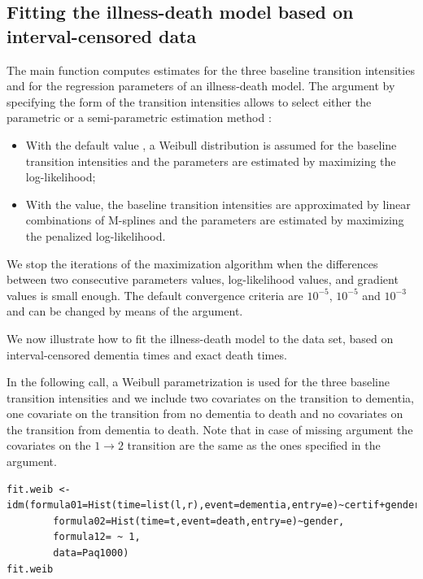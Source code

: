 \documentclass[article]{jss}
\begin{document}
\subsection{Fitting the illness-death model based on interval-censored data}
\label{sec-5-3}

The main function  computes estimates for the three baseline
transition intensities and for the regression parameters of an
illness-death model.  The  argument by specifying
the form of the transition intensities allows to select either the
parametric or a semi-parametric estimation method :

\begin{itemize}
\item With the default value , a Weibull distribution is
assumed for the baseline transition intensities and the parameters
are estimated by maximizing the log-likelihood;
\item With the  value, the baseline transition
intensities are approximated by linear combinations of
M-splines and the parameters are estimated by
maximizing the penalized log-likelihood.
\end{itemize}

We stop the iterations of the maximization algorithm when the differences 
between two consecutive
parameters values, log-likelihood values, and gradient values is small
enough.  The default convergence criteria are \(10^{-5}\), \(10^{-5}\) and
\(10^{-3}\) and can be changed by means of the  argument.

We now illustrate how to fit the illness-death model to the 
 data set, based on 
interval-censored dementia times and exact death times.

\bigskip

In the following call, a Weibull parametrization is used for the three baseline 
transition intensities and we include two covariates on the transition to dementia,
one covariate on the transition from no dementia to death and no covariates 
on the transition from dementia to death. Note that in case of missing 
argument the covariates on the \(1 \rightarrow 2\) transition are the same as 
the ones specified in the   argument.

\lstset{language=R,numbers=none}
\begin{lstlisting}
fit.weib <- idm(formula01=Hist(time=list(l,r),event=dementia,entry=e)~certif+gender,
		formula02=Hist(time=t,event=death,entry=e)~gender,
		formula12= ~ 1,
		data=Paq1000)
fit.weib
\end{lstlisting}
\end{document}
